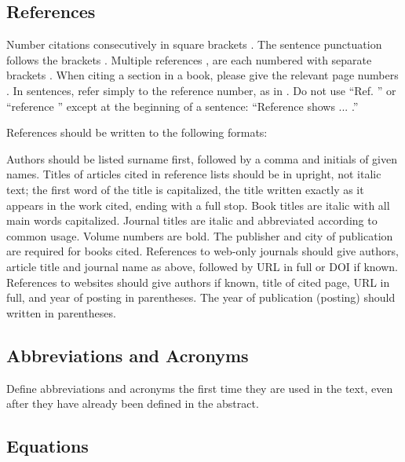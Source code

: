 \documentclass{fullpaper_hutech}
\begin{document}
\subsection{References}

Number citations consecutively in square brackets \cite{True00}. The sentence punctuation follows the brackets \cite{Schluter00}. Multiple references \cite{Schluter00}, \cite{Plazzo11} are each numbered with separate brackets \cite{True00,Schluter00,Plazzo11}. When citing a section in a book, please give the relevant page numbers \cite{Schluter00}. In sentences, refer simply to the reference number, as in \cite{Plazzo11}. Do not use ``Ref. \cite{Plazzo11}'' or ``reference \cite{Plazzo11}'' except at the beginning of a sentence: ``Reference \cite{Plazzo11} shows ... .''

References should be written to the following formats:

Authors should be listed surname first, followed by a comma and initials of given names. Titles of articles cited in reference lists should be in upright, not italic text; the first word of the title is capitalized, the title written exactly as it appears in the work cited, ending with a full stop. Book titles are italic with all main words capitalized. Journal titles are italic and abbreviated according to common usage. Volume numbers are bold. The publisher and city of publication are required for books cited. References to web-only journals should give authors, article title and journal name as above, followed by URL in full or DOI if known. References to websites should give authors if known, title of cited page, URL in full, and year of posting in parentheses. The year of publication (posting) should written in parentheses.

\subsection{Abbreviations and Acronyms}

Define abbreviations and acronyms the first time they are used in the text, even after they have already been defined in the abstract.

\subsection{Equations}
\end{document}
